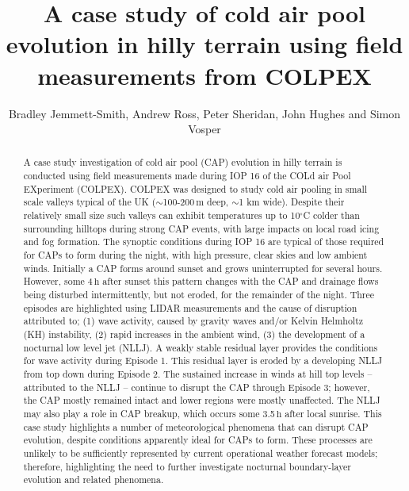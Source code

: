 \documentclass[times]{qjrms4}
\begin{document}

\title{A case study of cold air pool evolution in hilly terrain using field measurements from COLPEX}

\author{Bradley Jemmett-Smith\corrauth, Andrew Ross, Peter Sheridan, John Hughes and Simon Vosper}

\address{ University of Leeds, Leeds, UK  Met Office, Exeter, UK}


\begin{abstract}
A case study investigation of cold air pool (CAP) evolution in hilly terrain is conducted using field measurements made during IOP 16 of the COLd air Pool EXperiment (COLPEX). COLPEX was designed to study cold air pooling in small scale valleys typical of the UK ($\sim$100-200$\,\mbox{m}$ deep, $\sim$1 km wide). Despite their relatively small size such valleys can exhibit temperatures up to 10$^\circ$C colder than surrounding hilltops during strong CAP events, with large impacts on local road icing and fog formation. The synoptic conditions during IOP 16 are typical of those required for CAPs to form during the night, with high pressure, clear skies and low ambient winds. Initially a CAP forms around sunset and grows uninterrupted for several hours. However, some 4$\,\mbox{h}$ after sunset this pattern changes with the CAP and drainage flows being disturbed intermittently, but not eroded, for the remainder of the night. Three episodes are highlighted using LIDAR measurements and the cause of disruption attributed to; (1) wave activity, caused by gravity waves and/or Kelvin Helmholtz (KH) instability, (2) rapid increases in the ambient wind, (3) the development of a nocturnal low level jet (NLLJ). A weakly stable residual layer provides the conditions for wave activity during Episode 1. This residual layer is eroded by a developing NLLJ from top down during Episode 2. The sustained increase in winds at hill top levels -- attributed to the NLLJ -- continue to disrupt the CAP through Episode 3; however, the CAP mostly remained intact and lower regions were mostly unaffected. The NLLJ may also play a role in CAP breakup, which occurs some 3.5$\,\mbox{h}$ after local sunrise. This case study highlights a number of meteorological phenomena that can disrupt CAP evolution, despite conditions apparently ideal for CAPs to form. These processes are unlikely to be sufficiently represented by current operational weather forecast models; therefore, highlighting the need to further investigate nocturnal boundary-layer evolution and related phenomena.
\end{abstract}
\end{document}
